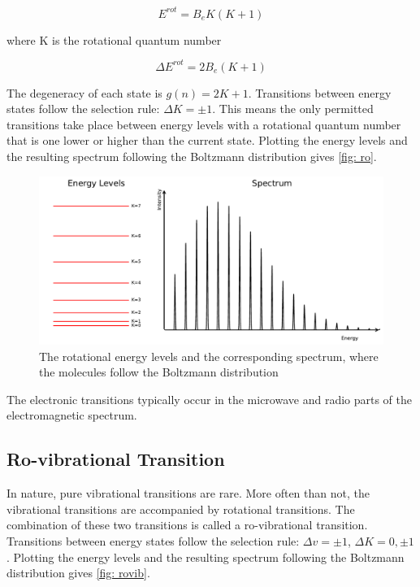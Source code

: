 \documentclass[twoside, single, authoryear, semicolon]{lion-msc}
\newcommand{\4}{$_4$}
\newcommand{\3}{$_3$}
\newcommand{\2}{$_2$}
\begin{document}
\begin{equation}
    E^{rot}=B_eK(K+1)
\end{equation}

where K is the rotational quantum number

\begin{equation}
    \Delta  E^{rot}=2B_e(K+1)
\end{equation}

The degeneracy of each state is $g(n)=2K+1$. Transitions between energy states follow the selection rule: $\Delta K=\pm 1$. This means the only permitted transitions take place between energy levels with a rotational quantum number that is one lower or higher than the current state. Plotting the energy levels and the resulting spectrum following the Boltzmann distribution gives \autoref{fig: ro}.

\begin{figure}[!ht]
    \centering
    \includegraphics[width=\linewidth]{Figures/RoSpectrum.pdf}
    \caption{The rotational energy levels and the corresponding spectrum, where the molecules follow the Boltzmann distribution}
    \label{fig: ro}
\end{figure}

The electronic transitions typically occur in the microwave and radio parts of the electromagnetic spectrum.
\subsection{Ro-vibrational Transition}
In nature, pure vibrational transitions are rare. More often than not, the vibrational transitions are accompanied by rotational transitions. The combination of these two transitions is called a ro-vibrational transition. Transitions between energy states follow the selection rule: $\Delta v=\pm 1$, $\Delta K=0, \pm 1$. Plotting the energy levels and the resulting spectrum following the Boltzmann distribution gives \autoref{fig: rovib}.
\end{document}

